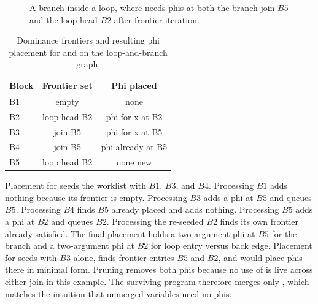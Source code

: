 \begin{figure}
\caption{A branch inside a loop, where  needs phis at both the branch join $B5$ and the loop head $B2$ after frontier iteration.}
\label{fig:ch12-ssa}
\end{figure}

\begin{table}
\caption{Dominance frontiers and resulting phi placement for  and  on the loop-and-branch graph.}
\label{tab:ch12-df}
\begin{tabular}{lcc}
\toprule
Block & Frontier set & Phi placed \\
\midrule
B1 & empty & none \\
B2 & loop head B2 & phi for x at B2 \\
B3 & join B5 & phi for x at B5 \\
B4 & join B5 & phi already at B5 \\
B5 & loop head B2 & none new \\
\bottomrule
\end{tabular}
\end{table}

Placement for  seeds the worklist with $B1$, $B3$, and $B4$.
Processing $B1$ adds nothing because its frontier is empty.
Processing $B3$ adds a phi at $B5$ and queues $B5$.
Processing $B4$ finds $B5$ already placed and adds nothing.
Processing $B5$ adds a phi at $B2$ and queues $B2$.
Processing the re-seeded $B2$ finds its own frontier already satisfied.
The final placement holds a two-argument phi at $B5$ for the branch and a two-argument phi at $B2$ for loop entry versus back edge.
Placement for  seeds with $B3$ alone, finds frontier entries $B5$ and $B2$, and would place phis there in minimal form.
Pruning removes both  phis because no use of  is live across either join in this example.
The surviving program therefore merges only , which matches the intuition that unmerged variables need no phis.

